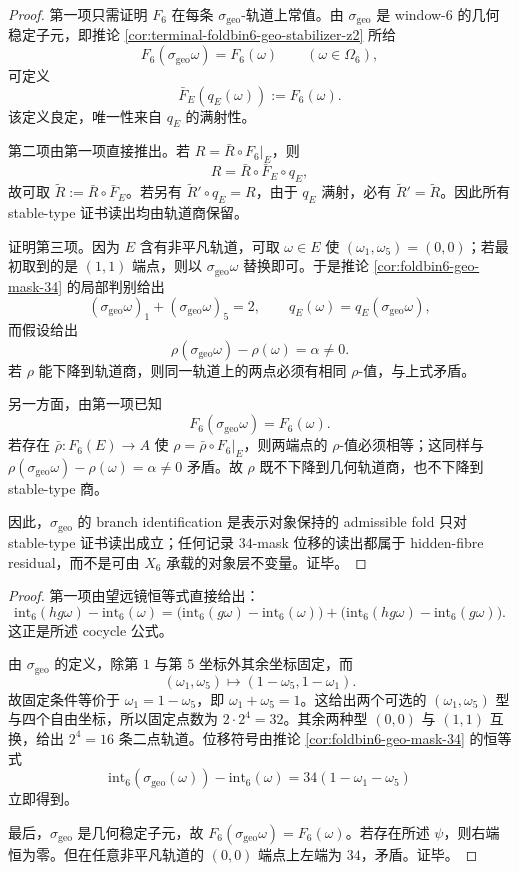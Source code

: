 \begin{proof}
第一项只需证明 \(F_6\) 在每条 \(\sigma_{\mathrm{geo}}\)-轨道上常值。由 \(\sigma_{\mathrm{geo}}\) 是 window-\(6\) 的几何稳定子元，即推论 \ref{cor:terminal-foldbin6-geo-stabilizer-z2} 所给
\[
F_6(\sigma_{\mathrm{geo}}\omega)=F_6(\omega)
\qquad(\omega\in\Omega_6),
\]
可定义
\[
\bar F_E(q_E(\omega)):=F_6(\omega).
\]
该定义良定，唯一性来自 \(q_E\) 的满射性。

第二项由第一项直接推出。若 \(R=\bar R\circ F_6|_E\)，则
\[
R=\bar R\circ\bar F_E\circ q_E,
\]
故可取 \(\widetilde R:=\bar R\circ\bar F_E\)。若另有 \(\widetilde R'\circ q_E=R\)，由于 \(q_E\) 满射，必有
\(\widetilde R'=\widetilde R\)。因此所有 stable-type 证书读出均由轨道商保留。

证明第三项。因为 \(E\) 含有非平凡轨道，可取 \(\omega\in E\) 使
\((\omega_1,\omega_5)=(0,0)\)；若最初取到的是 \((1,1)\) 端点，则以
\(\sigma_{\mathrm{geo}}\omega\) 替换即可。于是推论 \ref{cor:foldbin6-geo-mask-34} 的局部判别给出
\[
(\sigma_{\mathrm{geo}}\omega)_1+(\sigma_{\mathrm{geo}}\omega)_5=2,
\qquad
q_E(\omega)=q_E(\sigma_{\mathrm{geo}}\omega),
\]
而假设给出
\[
\rho(\sigma_{\mathrm{geo}}\omega)-\rho(\omega)=\alpha\ne0.
\]
若 \(\rho\) 能下降到轨道商，则同一轨道上的两点必须有相同 \(\rho\)-值，与上式矛盾。

另一方面，由第一项已知
\[
F_6(\sigma_{\mathrm{geo}}\omega)=F_6(\omega).
\]
若存在 \(\bar\rho:F_6(E)\to A\) 使 \(\rho=\bar\rho\circ F_6|_E\)，则两端点的 \(\rho\)-值必须相等；这同样与
\(\rho(\sigma_{\mathrm{geo}}\omega)-\rho(\omega)=\alpha\ne0\) 矛盾。故 \(\rho\) 既不下降到几何轨道商，也不下降到 stable-type 商。

因此，\(\sigma_{\mathrm{geo}}\) 的 branch identification 是表示对象保持的 admissible fold 只对 stable-type 证书读出成立；任何记录 \(34\)-mask 位移的读出都属于 hidden-fibre residual，而不是可由 \(X_6\) 承载的对象层不变量。证毕。
\end{proof}

\begin{proof}
第一项由望远镜恒等式直接给出：
\[
\mathrm{int}_6(hg\omega)-\mathrm{int}_6(\omega)
=\bigl(\mathrm{int}_6(g\omega)-\mathrm{int}_6(\omega)\bigr)
+\bigl(\mathrm{int}_6(hg\omega)-\mathrm{int}_6(g\omega)\bigr).
\]
这正是所述 cocycle 公式。

由 \(\sigma_{\mathrm{geo}}\) 的定义，除第 \(1\) 与第 \(5\) 坐标外其余坐标固定，而
\[
(\omega_1,\omega_5)\longmapsto (1-\omega_5,1-\omega_1).
\]
故固定条件等价于 \(\omega_1=1-\omega_5\)，即 \(\omega_1+\omega_5=1\)。这给出两个可选的 \((\omega_1,\omega_5)\) 型与四个自由坐标，所以固定点数为 \(2\cdot2^4=32\)。其余两种型 \((0,0)\) 与 \((1,1)\) 互换，给出 \(2^4=16\) 条二点轨道。位移符号由推论 \ref{cor:foldbin6-geo-mask-34} 的恒等式
\[
\mathrm{int}_6(\sigma_{\mathrm{geo}}(\omega))-\mathrm{int}_6(\omega)=34(1-\omega_1-\omega_5)
\]
立即得到。

最后，\(\sigma_{\mathrm{geo}}\) 是几何稳定子元，故 \(F_6(\sigma_{\mathrm{geo}}\omega)=F_6(\omega)\)。若存在所述 \(\psi\)，则右端恒为零。但在任意非平凡轨道的 \((0,0)\) 端点上左端为 \(34\)，矛盾。证毕。
\end{proof}

